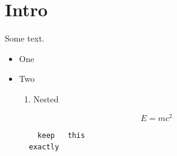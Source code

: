 \documentclass{article}
\begin{document}
\section{Intro}
Some text.
\begin{itemize}
	\item One
	\item Two
	\begin{enumerate}
		\item Nested
	\end{enumerate}
\end{itemize}
\begin{equation}
    E = mc^2
\end{equation}
\begin{figure}
	\centering
	\begin{verbatim}
  keep   this
exactly
	\end{verbatim}
\end{figure}
\end{document}
